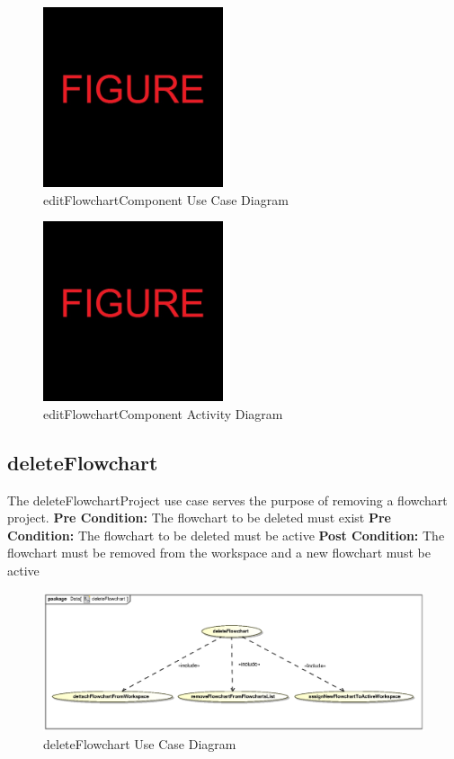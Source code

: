 \documentclass[11pt,a4paper,titlepage]{article}
\begin{document}
\begin{figure}[H]
  \centering
\includegraphics[width=200px]{figure.jpg}
\caption{editFlowchartComponent Use Case Diagram}
\end{figure}

\begin{figure}[H]
  \centering
\includegraphics[width=200px]{figure.jpg}
\caption{editFlowchartComponent Activity Diagram}
\end{figure}

\newpage
\subsection{deleteFlowchart}
The deleteFlowchartProject use case serves the purpose of removing a flowchart project.\newline\newline
\textbf{Pre Condition:} The flowchart to be deleted must exist\newline
\textbf{Pre Condition:} The flowchart to be deleted must be active\newline\newline
\textbf{Post Condition:} The flowchart must be removed from the workspace and a new flowchart must be active

\begin{figure}[H]
  \centering
\includegraphics[width=500px]{deleteFlowchart.eps}
\caption{deleteFlowchart Use Case Diagram}
\end{figure}
\end{document}
